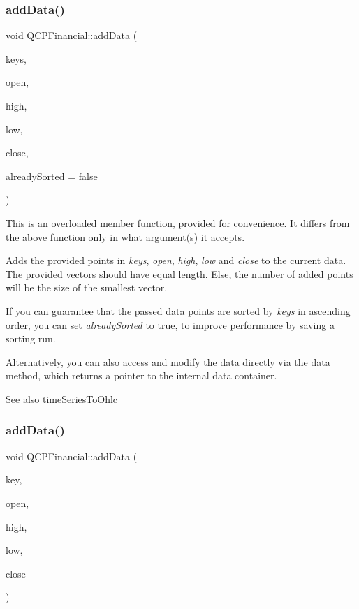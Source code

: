 \subsubsection{\texorpdfstring{addData()}{addData()}\hspace{0.1cm}{\footnotesize\ttfamily [1/2]}}
{\footnotesize\ttfamily void Q\+C\+P\+Financial\+::add\+Data (\begin{DoxyParamCaption}\item[{const Q\+Vector$<$ double $>$ \&}]{keys,  }\item[{const Q\+Vector$<$ double $>$ \&}]{open,  }\item[{const Q\+Vector$<$ double $>$ \&}]{high,  }\item[{const Q\+Vector$<$ double $>$ \&}]{low,  }\item[{const Q\+Vector$<$ double $>$ \&}]{close,  }\item[{bool}]{already\+Sorted = {\ttfamily false} }\end{DoxyParamCaption})}

This is an overloaded member function, provided for convenience. It differs from the above function only in what argument(s) it accepts.

Adds the provided points in {\itshape keys}, {\itshape open}, {\itshape high}, {\itshape low} and {\itshape close} to the current data. The provided vectors should have equal length. Else, the number of added points will be the size of the smallest vector.

If you can guarantee that the passed data points are sorted by {\itshape keys} in ascending order, you can set {\itshape already\+Sorted} to true, to improve performance by saving a sorting run.

Alternatively, you can also access and modify the data directly via the \mbox{\hyperlink{class_q_c_p_financial_aec3f666271cf48bd7b87d84fe3f8c074}{data}} method, which returns a pointer to the internal data container.

\begin{DoxySeeAlso}{See also}
\mbox{\hyperlink{class_q_c_p_financial_a9a058c035040d3939b8884f4aaccb1a7}{time\+Series\+To\+Ohlc}} 
\end{DoxySeeAlso}
\mbox{\label{class_q_c_p_financial_a688bbd052e00a02954ddb0068b378170}} 
\subsubsection{\texorpdfstring{addData()}{addData()}\hspace{0.1cm}{\footnotesize\ttfamily [2/2]}}
{\footnotesize\ttfamily void Q\+C\+P\+Financial\+::add\+Data (\begin{DoxyParamCaption}\item[{double}]{key,  }\item[{double}]{open,  }\item[{double}]{high,  }\item[{double}]{low,  }\item[{double}]{close }\end{DoxyParamCaption})}

